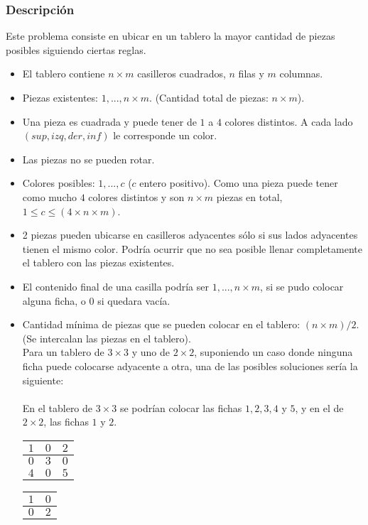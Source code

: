 \documentclass[11pt, a4paper, twoside]{article}
\begin{document}
{}

\subsubsection{Descripción}

Este problema consiste en ubicar en un tablero la mayor cantidad de piezas posibles siguiendo ciertas reglas.  

\begin{itemize}
	\item El tablero contiene $n \times m$ casilleros cuadrados, $n$ filas y $m$ columnas. 
	\item Piezas existentes: $1,...,n \times m$. (Cantidad total de piezas: $n \times m$).     
	\item Una pieza es cuadrada y puede tener de $1$ a $4$ colores distintos. A cada lado $(sup, izq, der, inf)$ le corresponde un color. 
	\item Las piezas no se pueden rotar.
	\item Colores posibles: $1,...,c$ ($c$ entero positivo). Como una pieza puede tener como mucho $4$ colores distintos y son $n \times m$ piezas en total, $ 1 \le c \le (4 \times n \times m)$.  
	\item 2 piezas pueden ubicarse en casilleros adyacentes sólo si sus lados adyacentes tienen el mismo color. Podría ocurrir que no sea posible llenar completamente el tablero con las piezas existentes. 
	\item El contenido final de una casilla podría ser $1,...,n \times m$, si se pudo colocar alguna ficha, o $0$ si quedara vacía. 
	\item Cantidad mínima de piezas que se pueden colocar en el tablero: $(n \times m)/ 2$. (Se intercalan las piezas en el tablero). \\
	Para un tablero de $3\times 3$ y uno de $2\times 2$, suponiendo un caso donde ninguna ficha puede colocarse adyacente a otra, una de las posibles soluciones sería la siguiente: \\
	\\
	En el tablero de $3\times 3$ se podrían colocar las fichas $1,2,3,4$ y $5$, y en el de $2\times 2$, las fichas $1$ y $2$.  \\

	\begin{minipage}{0.2\textwidth}
		\begin{tabular}{|c|c|c|}
			\hline
			 $1$ & $0$ & $2$ \\
			\hline
			 $0$ & $3$ & $0$  \\
			\hline 
			 $4$ & $0$ & $5$ \\
			\hline
		\end{tabular}
	\end{minipage}
	\begin{minipage}{0.2\textwidth}
		\begin{tabular}{|c|c|}
			\hline
			 $1$ & $0$ \\
			\hline
			 $0$ & $2$ \\
			\hline
		\end{tabular}
	\end{minipage}

\end{itemize} 
\end{document}
